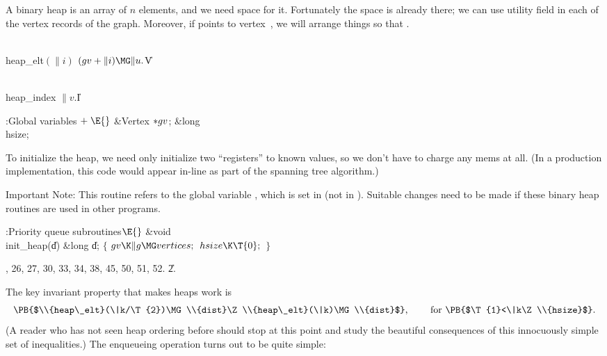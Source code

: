 A binary heap is an array of $n$ elements, and we need space for it.
Fortunately the space is already there; we can use utility field
 in each of the vertex records of the graph. Moreover, if
 points to vertex~, we will arrange things so
that
.

\Y\B\4\D\\{heap\_elt}$(\|i)$\5
$(\\{gv}+\|i)\MG\|u.{}$\|V\par
\B\4\D\\{heap\_index}\5
$\|v.{}$\|I%
\par
\Y\B\4:Global variables\X${}\mathrel+\E{}$\6
\&{Vertex} ${}{*}\\{gv}{}$;\6
\&{long} \\{hsize};\par
\fi

To initialize the heap, we need only initialize two ``registers'' to
known values, so we don't have to charge any mems at all. (In a production
implementation, this code would appear in-line as part of the
spanning tree algorithm.)

Important Note: This routine refers to the global variable , which is
set in  (not in ). Suitable changes need to be
made
if these binary heap routines are used in other programs.

\Y\B\4:Priority queue subroutines\X${}\E{}$\6
\1\1\&{void} \\{init\_heap}(\|d)\6
\&{long} \|d;\2\2\6
${}\{{}$\1\6
${}\\{gv}\K\|g\MG\\{vertices};{}$\6
${}\\{hsize}\K\T{0};{}$\6
\4${}\}{}$\2\par
{}, 26, 27, 30, 33, 34, 38, 45, 50, 51, 52.
\U2.\fi

The key invariant property that makes heaps work is
$$\hbox{\PB{$\\{heap\_elt}(\|k/\T{2})\MG\\{dist}\Z\\{heap\_elt}(\|k)\MG%
\\{dist}$}, \qquad for \PB{$\T{1}<\|k\Z\\{hsize}$}.}$$
(A reader who has not seen heap ordering before should stop at this
point and study the beautiful consequences of this innocuously simple
set of inequalities.) The enqueueing operation turns out to be quite simple:

